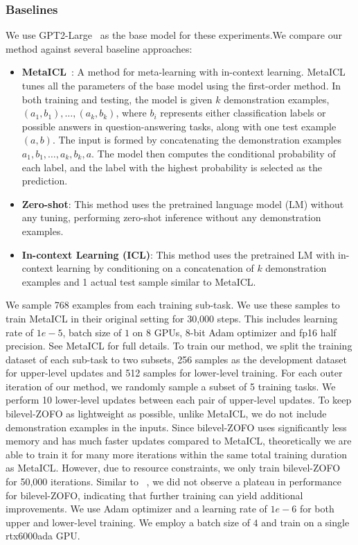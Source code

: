 \subsubsection{Baselines}
We use GPT2-Large~\cite{radford2019gpt2} as the base model for these experiments.We compare our method against several baseline approaches:
\begin{itemize}
    \item \textbf{MetaICL}~\citep{MinLZH22MetaICL}: A method for meta-learning with in-context learning. MetaICL tunes all the parameters of the base model using the first-order method. In both training and testing, the model is given $k$ demonstration examples, ${(a_1,b_1), \dots, (a_k,b_k)}$, where $b_i$ represents either classification labels or possible answers in question-answering tasks, along with one test example $(a,b)$. The input is formed by concatenating the demonstration examples $a_1,b_1, \dots, a_k,b_k,a$. The model then computes the conditional probability of each label, and the label with the highest probability is selected as the prediction.
    \item \textbf{Zero-shot}: This method uses the pretrained language model (LM) without any tuning, performing zero-shot inference without any demonstration examples.
    \item \textbf{In-context Learning (ICL)}: This method uses the pretrained LM with in-context learning by conditioning on a concatenation of $k$ demonstration examples and 1 actual test sample similar to MetaICL.
\end{itemize}

We sample 768 examples from each training sub-task. We use these samples to train MetaICL in their original setting for 30,000 steps. This includes learning rate of $1e-5$, batch size of $1$ on $8$ GPUs, 8-bit Adam optimizer and fp16 half precision. See MetaICL\citep{MinLZH22MetaICL} for full details.  To train our method, we split the training dataset of each sub-task to two subsets, 256 samples as the development dataset for upper-level updates and 512 samples for lower-level training. For each outer iteration of our method, we randomly sample a subset of 5 training tasks. We perform 10 lower-level updates between each pair of upper-level updates. To keep bilevel-ZOFO as lightweight as possible, unlike MetaICL, we do not include demonstration examples in the inputs. Since bilevel-ZOFO uses significantly less memory and has much faster updates compared to MetaICL, theoretically we are able to train it for many more iterations within the same total training duration as MetaICL. However, due to resource constraints, we only train bilevel-ZOFO for 50,000 iterations. Similar to ~\cite{MalladiGNDL0A23Mezo}, we did not observe a plateau in performance for bilevel-ZOFO, indicating that further training can yield additional improvements. We use Adam optimizer and a learning rate of $1e-6$ for both upper and lower-level training. We employ a batch size of $4$ and train on a single rtx6000ada GPU.

